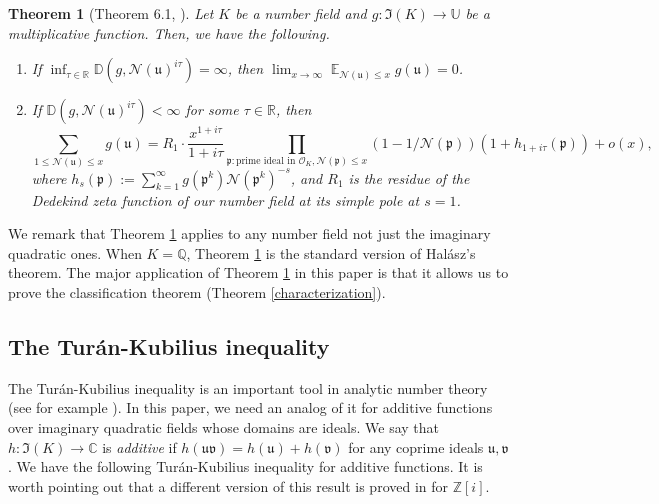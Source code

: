 \documentclass[11pt]{amsart}
\newtheorem{theorem}[lemma]{Theorem}
\theoremstyle{definition}
\DeclareMathOperator*{\E}{\mathbb{E}}
\newcommand{\C}{{\mathbb C}}
\newcommand{\D}{{\mathbb D}}
\newcommand{\NN}{{\mathcal N}}
\newcommand{\Q}{{\mathbb Q}}
\newcommand{\R}{{\mathbb R}}
\newcommand{\Z}{{\mathbb Z}}
\newcommand{\U}{{\mathbb U}}
\newcommand{\mf}{\mathfrak}
\newcommand{\WS}[1]{{\color{blue}{{#1}}}}
\newcommand{\AK}[1]{{\color{ForestGreen}{{#1}}}}
\begin{document}
\begin{theorem}[Theorem 6.1, \cite{lucht2001}]\label{C22intro}
     Let $K$ be a number field and $g\colon\mf{I}(K)\to\U$ be a multiplicative function. Then, we have the following.
     \begin{enumerate}
         \item If $\inf_{\tau\in\R}\D(g,\NN(\mf u)^{i\tau})=\infty$, then $\lim_{x \to \infty} \E_{\NN(\mf u)\leq x}g(\mf u)=0$.
         \item If $\D(g,\NN(\mf u)^{i\tau})<\infty$ for some $\tau\in\R$, then
         $$\sum_{1 \leq \NN(\mf u)\leq x}g(\mf u) = R_1\cdot\frac{x^{1+i\tau}}{1+i\tau}\prod_{\mf p\colon \text{prime ideal in } \mathcal{O}_K,\NN(\mf p)\leq x}(1-1/\NN(\mf p))(1+h_{1+i\tau}(\mf p))+o(x),$$
         where $h_{s}(\mf p):=\sum_{k=1}^{\infty}g(\mf p^{k})\NN(\mf p^{k})^{-s}$, and $R_1$ is the residue of the Dedekind zeta function of our number field at its simple pole at $s=1$.
     \end{enumerate}
\end{theorem}
We remark that Theorem \ref{C22intro} applies to any number field not just the imaginary quadratic ones. When $K=\Q$, Theorem \ref{C22intro} is the standard version of Hal\'asz's theorem.
The major application of Theorem \ref{C22intro} in this paper is that it allows us to prove the classification theorem (Theorem \ref{characterization}). 
\fi
\subsection{The Tur\'an-Kubilius inequality}


The Tur\'an-Kubilius inequality is an important tool in analytic number theory (see for example \cite[Lemma~4.1]{E79book}). In this paper, we need an analog of it for additive functions over imaginary quadratic fields whose domains are ideals.
We say that $h: \mf I(K) \to \C$ is \emph{additive} if   $h(\mf u \mf v)=h(\mf u)+h(\mf v)$ for any coprime ideals $\mf u, \mf v$.
We have the following Tur\'an-Kubilius inequality for additive functions. 
It is worth pointing out that a different version of this result is proved in \cite[Chapter~10]{kubiliusbook} for $\Z[i]$.
\end{document}
